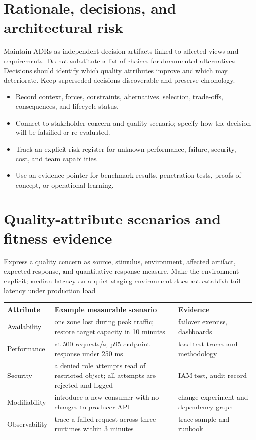 \documentclass[10pt,letterpaper]{article}
\begin{document}
\section{Rationale, decisions, and architectural risk}
Maintain ADRs as independent decision artifacts linked to affected views and requirements. Do not substitute a list of choices for documented alternatives. Decisions should identify which quality attributes improve and which may deteriorate. Keep superseded decisions discoverable and preserve chronology.

\begin{itemize}
\item Record context, forces, constraints, alternatives, selection, trade-offs, consequences, and lifecycle status.
\item Connect to stakeholder concern and quality scenario; specify how the decision will be falsified or re-evaluated.
\item Track an explicit risk register for unknown performance, failure, security, cost, and team capabilities.
\item Use an evidence pointer for benchmark results, penetration tests, proofs of concept, or operational learning.
\end{itemize}
\section{Quality-attribute scenarios and fitness evidence}
Express a quality concern as source, stimulus, environment, affected artifact, expected response, and quantitative response measure. Make the environment explicit; median latency on a quiet staging environment does not establish tail latency under production load.

\small
\begin{tabularx}{\linewidth}{@{}YYY@{}}
\toprule
\textbf{Attribute} & \textbf{Example measurable scenario} & \textbf{Evidence} \\
\midrule
Availability & one zone lost during peak traffic; restore target capacity in 10 minutes & failover exercise, dashboards \\
Performance & at 500 requests/s, p95 endpoint response under 250 ms & load test traces and methodology \\
Security & a denied role attempts read of restricted object; all attempts are rejected and logged & IAM test, audit record \\
Modifiability & introduce a new consumer with no changes to producer API & change experiment and dependency graph \\
Observability & trace a failed request across three runtimes within 3 minutes & trace sample and runbook \\
\bottomrule
\end{tabularx}
\normalsize
{}
\end{document}
